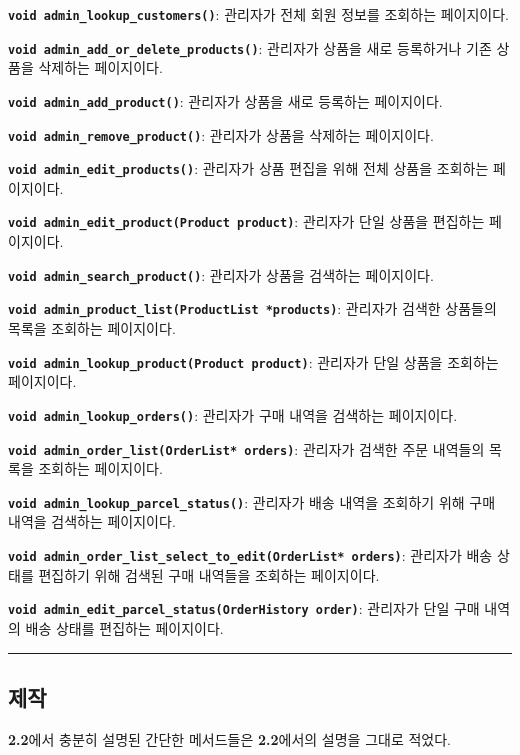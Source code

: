 \documentclass[runningheads]{llncs}
\begin{document}
\textbf{\texttt{void admin_lookup_customers()}}: 관리자가 전체 회원 정보를 조회하는 페이지이다.

\textbf{\texttt{void admin_add_or_delete_products()}}: 관리자가 상품을 새로 등록하거나 기존 상품을 삭제하는 페이지이다.

\textbf{\texttt{void admin_add_product()}}: 관리자가 상품을 새로 등록하는 페이지이다.

\textbf{\texttt{void admin_remove_product()}}: 관리자가 상품을 삭제하는 페이지이다.

\textbf{\texttt{void admin_edit_products()}}: 관리자가 상품 편집을 위해 전체 상품을 조회하는 페이지이다.

\textbf{\texttt{void admin_edit_product(Product product)}}: 관리자가 단일 상품을 편집하는 페이지이다.

\textbf{\texttt{void admin_search_product()}}: 관리자가 상품을 검색하는 페이지이다.

\textbf{\texttt{void admin_product_list(ProductList *products)}}: 관리자가 검색한 상품들의 목록을 조회하는 페이지이다.

\textbf{\texttt{void admin_lookup_product(Product product)}}: 관리자가 단일 상품을 조회하는 페이지이다.

\textbf{\texttt{void admin_lookup_orders()}}: 관리자가 구매 내역을 검색하는 페이지이다.

\textbf{\texttt{void admin_order_list(OrderList* orders)}}: 관리자가 검색한 주문 내역들의 목록을 조회하는 페이지이다.

\textbf{\texttt{void admin_lookup_parcel_status()}}: 관리자가 배송 내역을 조회하기 위해 구매 내역을 검색하는 페이지이다.

\textbf{\texttt{void admin_order_list_select_to_edit(OrderList* orders)}}: 관리자가 배송 상태를 편집하기 위해 검색된 구매 내역들을 조회하는 페이지이다.

\textbf{\texttt{void admin_edit_parcel_status(OrderHistory order)}}: 관리자가 단일 구매 내역의 배송 상태를 편집하는 페이지이다.

\noindent\rule{2cm}{0.4pt}

\subsection{제작}
\textbf{2.2}에서 충분히 설명된 간단한 메서드들은 \textbf{2.2}에서의 설명을 그대로 적었다.
\end{document}
